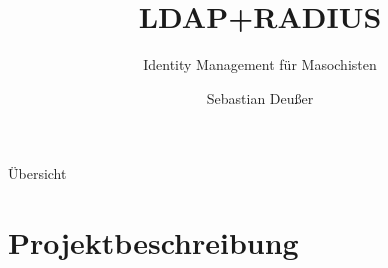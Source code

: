 \documentclass[handout,svgnames]{beamer}
\title[OpenLDAP- und FreeRADIUS-Server]   %
{LDAP+RADIUS}
\subtitle
{Identity Management für Masochisten} %
\author %
{Sebastian Deußer}
\begin{document}
\setcounter{framenumber}{-1}
{
\frame{\titlepage}
}


\section{}
\begin{frame}{Übersicht}
\tableofcontents
\end{frame}
\note{}


\section{Projektbeschreibung}
\end{document}
